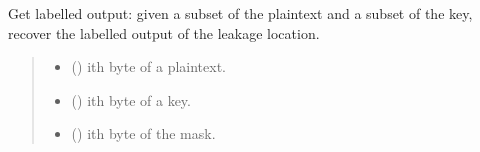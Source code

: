 \documentclass[letterpaper,10pt,english]{sphinxmanual}
\begin{document}
\begin{fulllineitems}
\begin{fulllineitems}
\begin{quote}
\begin{description}
\begin{itemize}
\end{itemize}

\end{description}\end{quote}

\end{fulllineitems}


\begin{fulllineitems}
\label{\detokenize{MLSCAlib.Ciphers:MLSCAlib.Ciphers.AES_leakage.AESLeakageModel.get_imbalanced_classes}}
\pysigstartsignatures
{}
\pysigstopsignatures
\end{fulllineitems}


\begin{fulllineitems}
\label{\detokenize{MLSCAlib.Ciphers:MLSCAlib.Ciphers.AES_leakage.AESLeakageModel.get_labelled_output}}
\pysigstartsignatures
{}
\pysigstopsignatures
\sphinxAtStartPar
Get labelled output: given a subset of the plaintext and a subset of the key,
recover the labelled output of the leakage location.
\begin{quote}\begin{description}
\begin{itemize}
\item {} 
\sphinxAtStartPar
{} () \textendash{} i\sphinxhyphen{}th byte of a plaintext.

\item {} 
\sphinxAtStartPar
{} () \textendash{} i\sphinxhyphen{}th byte of a key.

\item {} 
\sphinxAtStartPar
{} (\sphinxstyleliteralemphasis{\sphinxupquote{, }}) \textendash{} i\sphinxhyphen{}th byte of the mask.


\end{itemize}
\end{description}
\end{quote}
\end{fulllineitems}
\end{fulllineitems}
\end{document}
